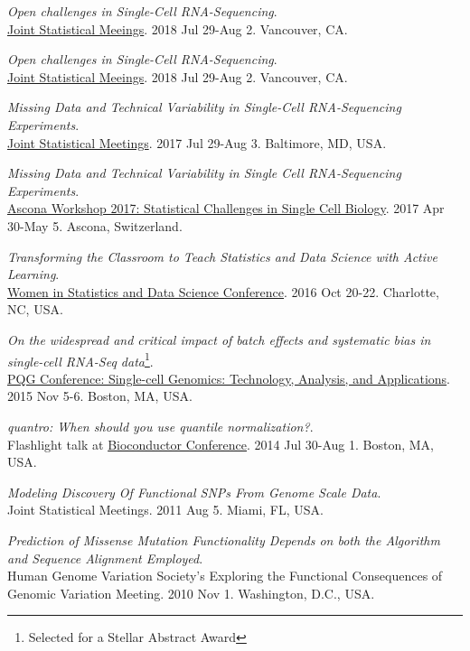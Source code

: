 \documentclass[10pt]{article}
\begin{document}
\item 
{\it Open challenges in Single-Cell RNA-Sequencing}. \\
\href{https://ww2.amstat.org/meetings/jsm/2018/onlineprogram/ActivityDetails.cfm?SessionID=215111}{Joint Statistical Meeings}. 2018 Jul 29-Aug 2. Vancouver, CA.
\item 
{\it Open challenges in Single-Cell RNA-Sequencing}. \\
\href{https://ww2.amstat.org/meetings/jsm/2018/onlineprogram/ActivityDetails.cfm?SessionID=215111}{Joint Statistical Meeings}. 2018 Jul 29-Aug 2. Vancouver, CA.
\item 
{\it Missing Data and Technical Variability in Single-Cell RNA-Sequencing Experiments}. \\
\href{https://ww2.amstat.org/meetings/jsm/2017/}{Joint Statistical Meetings}. 2017 Jul 29-Aug 3. Baltimore, MD, USA.
\item 
{\it Missing Data and Technical Variability in Single Cell RNA-Sequencing Experiments}. \\
\href{https://www.bsse.ethz.ch/cbg/cbg-news/ascona-2017.html}{Ascona Workshop 2017: Statistical Challenges in Single Cell Biology}. 2017 Apr 30-May 5. Ascona, Switzerland.
\item 
{\it Transforming the Classroom to Teach Statistics and Data Science with Active Learning}. \\ 
\href{http://www.amstat.org/meetings/wsds/2016/}{Women in Statistics and Data Science Conference}. 2016 Oct 20-22. Charlotte, NC, USA.
\item
{\it On the widespread and critical impact of batch effects and systematic bias in single-cell RNA-Seq data}\footnote{Selected for a Stellar Abstract Award}. \\ 
 \href{https://www.hsph.harvard.edu/2015-pqg-conference/}{PQG Conference: Single-cell Genomics: Technology, Analysis, and Applications}. 2015 Nov 5-6. Boston, MA, USA.
\item 
{\it quantro: When should you use quantile normalization?}. \\ 
Flashlight talk at \href{https://www.bioconductor.org/help/course-materials/2014/BioC2014/}{Bioconductor Conference}. 2014 Jul 30-Aug 1. Boston, MA, USA.
\item 
{\it Modeling Discovery Of Functional SNPs From Genome Scale Data}. \\
Joint Statistical Meetings. 2011 Aug 5. Miami, FL, USA.
\item 
{\it Prediction of Missense Mutation Functionality Depends on both the Algorithm and Sequence Alignment Employed}. \\
Human Genome Variation Society's Exploring the Functional Consequences of Genomic Variation Meeting. 2010 Nov 1. Washington, D.C., USA.
\end{document}
